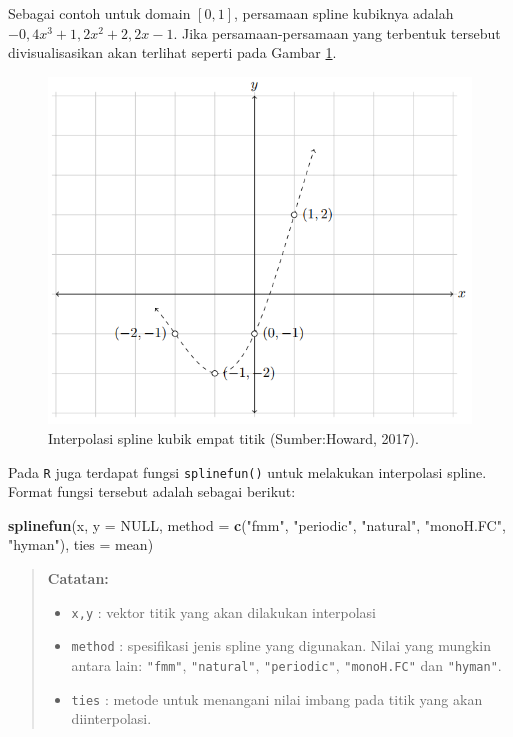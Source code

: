 \documentclass[]{book}
\newenvironment{Shaded}{\begin{snugshade}}{\end{snugshade}}
\newcommand{\DataTypeTok}[1]{\textcolor[rgb]{0.13,0.29,0.53}{#1}}
\newcommand{\KeywordTok}[1]{\textcolor[rgb]{0.13,0.29,0.53}{\textbf{#1}}}
\newcommand{\NormalTok}[1]{#1}
\newcommand{\OtherTok}[1]{\textcolor[rgb]{0.56,0.35,0.01}{#1}}
\newcommand{\StringTok}[1]{\textcolor[rgb]{0.31,0.60,0.02}{#1}}
\providecommand{\tightlist}{%
  \setlength{\itemsep}{0pt}\setlength{\parskip}{0pt}}
\theoremstyle{definition}
\theoremstyle{definition}
\theoremstyle{definition}
\theoremstyle{remark}
\begin{document}
Sebagai contoh untuk domain \(\left[0,1\right]\), persamaan spline kubiknya adalah \(-0,4x^3+1,2x^2+2,2x-1\). Jika persamaan-persamaan yang terbentuk tersebut divisualisasikan akan terlihat seperti pada Gambar \ref{fig:cubicsplineviz}.

\begin{figure}

{\centering \includegraphics[width=0.8\linewidth]{./images/cubicsplineviz} 

}

\caption{Interpolasi spline kubik empat titik 
(Sumber:Howard, 2017).}\label{fig:cubicsplineviz}
\end{figure}

Pada \texttt{R} juga terdapat fungsi \texttt{splinefun()} untuk melakukan interpolasi spline. Format fungsi tersebut adalah sebagai berikut:

\begin{Shaded}
\begin{Highlighting}[]
\KeywordTok{splinefun}\NormalTok{(x, }\DataTypeTok{y =} \OtherTok{NULL}\NormalTok{,}
          \DataTypeTok{method =} \KeywordTok{c}\NormalTok{(}\StringTok{"fmm"}\NormalTok{, }\StringTok{"periodic"}\NormalTok{, }\StringTok{"natural"}\NormalTok{, }\StringTok{"monoH.FC"}\NormalTok{, }\StringTok{"hyman"}\NormalTok{),}
          \DataTypeTok{ties =}\NormalTok{ mean)}
\end{Highlighting}
\end{Shaded}

\begin{quote}
\textbf{Catatan:}

\begin{itemize}
\tightlist
\item
  \texttt{x,y} : vektor titik yang akan dilakukan interpolasi
\item
  \texttt{method} : spesifikasi jenis spline yang digunakan. Nilai yang mungkin antara lain: \texttt{"fmm"}, \texttt{"natural"}, \texttt{"periodic"}, \texttt{"monoH.FC"} dan \texttt{"hyman"}.
\item
  \texttt{ties} : metode untuk menangani nilai imbang pada titik yang akan diinterpolasi.
\end{itemize}
\end{quote}
\end{document}
